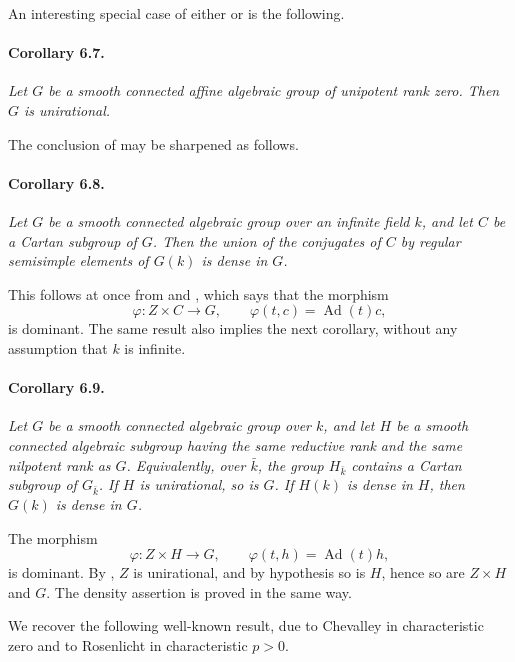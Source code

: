 An interesting special case of either  or  is the
following.

\paragraph{\textbf{Corollary 6.7.}}
{\itshape Let \(G\) be a smooth connected affine algebraic group
of unipotent rank zero. Then \(G\) is unirational.}

The conclusion of  may be sharpened as follows.

\paragraph{\textbf{Corollary 6.8.}}
{\itshape Let \(G\) be a smooth connected algebraic group over an
infinite field \(k\), and let \(C\) be a Cartan subgroup of \(G\).
Then the union of the conjugates of \(C\) by regular semisimple
elements of \(G(k)\) is dense in \(G\).}

This follows at once from  and , which says that the
morphism
\[
  \varphi\colon Z\times C\longrightarrow G,\qquad
  \varphi(t,c)=\operatorname{Ad}(t)c,
\]
is dominant. The same result also implies the next corollary,
without any assumption that \(k\) is infinite.

\paragraph{\textbf{Corollary 6.9.}}
{\itshape Let \(G\) be a smooth connected algebraic group over
\(k\), and let \(H\) be a smooth connected algebraic subgroup
having the same reductive rank and the same nilpotent rank as
\(G\). Equivalently, over \(\bar k\), the group \(H_{\bar k}\)
contains a Cartan subgroup of \(G_{\bar k}\). If \(H\) is
unirational, so is \(G\). If \(H(k)\) is dense in \(H\), then
\(G(k)\) is dense in \(G\).}

The morphism
\[
  \varphi\colon Z\times H\longrightarrow G,\qquad
  \varphi(t,h)=\operatorname{Ad}(t)h,
\]
is dominant. By , \(Z\) is unirational, and by hypothesis so
is \(H\), hence so are \(Z\times H\) and \(G\). The density
assertion is proved in the same way.

We recover the following well-known result, due to Chevalley in
characteristic zero and to Rosenlicht in characteristic
\(p>0\).

